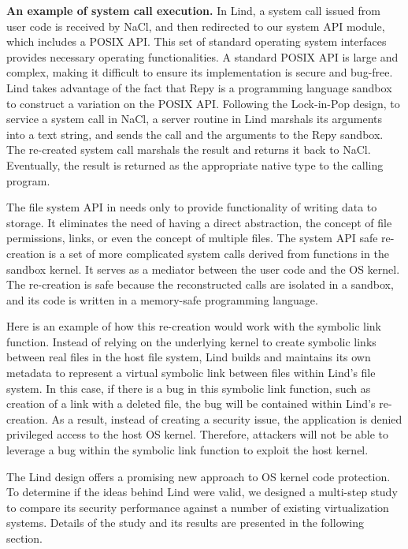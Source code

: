 \textbf{An example of system call execution.}
In Lind, a system call issued from user code is
received by NaCl, and then redirected to our system API module, which
includes a POSIX API. This set of standard
operating system interfaces provides
necessary operating functionalities. A standard POSIX API is large and complex,
making it difficult to ensure its implementation is secure and bug-free.
Lind takes advantage of the fact that Repy is a programming language sandbox to
construct a variation on the POSIX API. Following the
Lock-in-Pop design, to service a system call in NaCl, a server routine in
Lind marshals its arguments into a text string, and sends the call and the arguments
to the Repy sandbox. The re-created system call marshals the result and
returns it back to NaCl. Eventually, the result is returned as the appropriate
native type to the calling program.

The file system API in \lip needs only
to provide functionality of writing data to storage.
It eliminates the need of having a direct abstraction, the
concept of file permissions, links, or even the concept of multiple files.
The system API safe re-creation is a set of more complicated system calls
derived from functions in the sandbox kernel.
It serves as a mediator between the user code
and the OS kernel. The re-creation is safe
because the reconstructed calls are isolated in a sandbox, and its code is written 
in a memory-safe programming language.

Here is an example of how this re-creation would work with the symbolic link function. 
Instead of relying on the underlying kernel to create symbolic links between real files 
in the host file system, Lind builds and maintains its own metadata to represent a virtual symbolic link 
between files within Lind's file system. In this case, if there is a bug in this symbolic link function, 
such as creation of a link with a deleted file, the bug will be contained within Lind's re-creation. 
As a result, instead of creating a security issue, the application is denied privileged access
to the host OS kernel. 
Therefore, attackers will not be able to leverage a bug within the symbolic link function to 
exploit the host kernel.  


The Lind design offers a promising new approach to OS kernel code protection. 
To determine if the ideas behind Lind were valid, we 
designed a multi-step study to compare its security performance against a number 
of existing virtualization systems. Details of the study and its results are presented 
in the following section.
